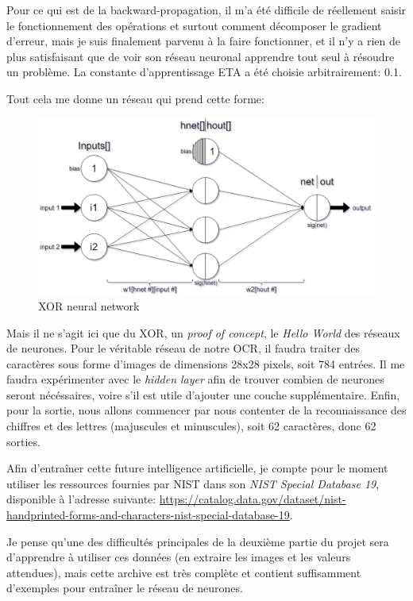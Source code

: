 \documentclass[12pt]{report}
\begin{document}
Pour ce qui est de la backward-propagation, il m'a été difficile de réellement saisir le fonctionnement des opérations et surtout comment décomposer le gradient d'erreur, mais je suis finalement parvenu à la faire fonctionner, et il n'y a rien de plus satisfaisant que de voir son réseau neuronal apprendre tout seul à résoudre un problème. La constante d'apprentissage ETA a été choisie arbitrairement: 0.1. 

\newpage
Tout cela me donne un réseau qui prend cette forme:

\begin{figure}[H]
    \centering
    \includegraphics[width=1\textwidth]{XOR_Neural_Network}
    \caption{XOR neural network}
\end{figure}

Mais il ne s'agit ici que du XOR, un \textit{proof of concept}, le \textit{Hello World} des réseaux de neurones. Pour le véritable réseau de notre OCR, il faudra traiter des caractères sous forme d'images de dimensions 28x28 pixels, soit 784 entrées. Il me faudra expérimenter avec le \textit{hidden layer} afin de trouver combien de neurones seront nécéssaires, voire s'il est utile d'ajouter une couche supplémentaire. Enfin, pour la sortie, nous allons commencer par nous contenter de la reconnaissance des chiffres et des lettres (majuscules et minuscules), soit 62 caractères, donc 62 sorties.

Afin d'entraîner cette future intelligence artificielle, je compte pour le moment utiliser les ressources fournies par NIST dans son \textit{NIST Special Database 19}, disponible à l'adresse suivante: \url{https://catalog.data.gov/dataset/nist-handprinted-forms-and-characters-nist-special-database-19}. 

Je pense qu'une des difficultés principales de la deuxième partie du projet sera d'apprendre à utiliser ces données (en extraire les images et les valeurs attendues), mais cette archive est très complète et contient suffisamment d'exemples pour entraîner le réseau de neurones.
\end{document}
